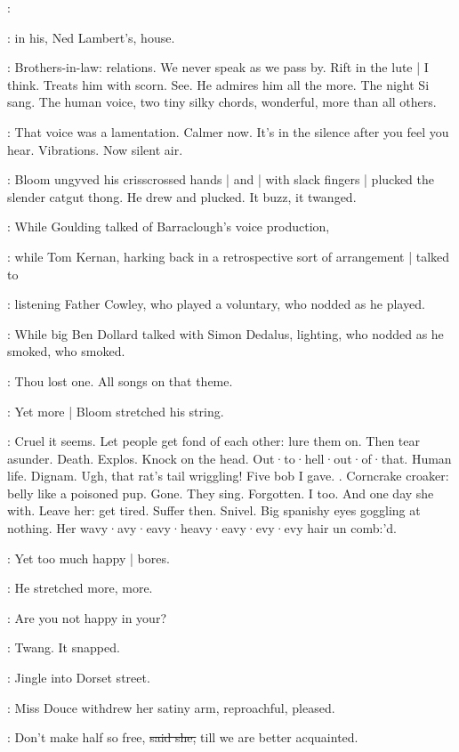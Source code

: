 \simon:

:
in his,
Ned Lambert's,
house.

\BloomIntB:
Brothers-in-law:
relations.
We never speak as we pass by.
Rift in the lute |
I think.
Treats him with scorn.
See.
He admires him all the more.
The night Si sang.
The human voice,
two tiny silky chords,
wonderful,
more than all others.

\BloomIntA:
That voice was a lamentation.
Calmer now.
It's in the silence after
you feel you hear.
Vibrations.
Now silent air.

:
Bloom ungyved his crisscrossed hands |
and |
with slack fingers |
plucked the slender catgut thong.
He drew and plucked.
It buzz,
it twanged.

:
While Goulding talked of Barraclough's voice production,

:
while Tom Kernan,
harking back in a retrospective sort of arrangement |
talked to 

:
listening Father Cowley,
who played a voluntary,
who nodded as he played.

:
While big Ben Dollard talked with Simon Dedalus,
lighting,
who nodded as he smoked,
who smoked.

\BloomIntB:
Thou lost one.
All songs on that theme.

:
Yet more |
Bloom stretched his string.

\BloomIntB:
Cruel it seems.
Let people get fond of each other:
lure them on.
Then tear asunder.
Death.
Explos.
Knock on the head.
Out·to·hell·out·of·that.
Human life.
Dignam.
Ugh,
that rat's tail wriggling!
Five bob I gave.
.
Corncrake croaker:
belly like a poisoned pup.
Gone.
They sing.
Forgotten.
I too.
And one day she with.
Leave her:
get tired.
Suffer then.
Snivel.
Big spanishy eyes goggling at nothing.
Her wavy·avy·eavy·heavy·eavy·evy·evy hair un comb:'d.

\BloomIntB:
Yet too much happy |
bores.

:
He stretched more,
more.

\BloomIntA:
Are you not happy in your?

:
Twang.
It snapped.

:
Jingle into Dorset street.

:
Miss Douce withdrew her satiny arm,
reproachful,
pleased.

\MissD:
Don't make half so free,
\sout{said she,}
till we are better acquainted.

